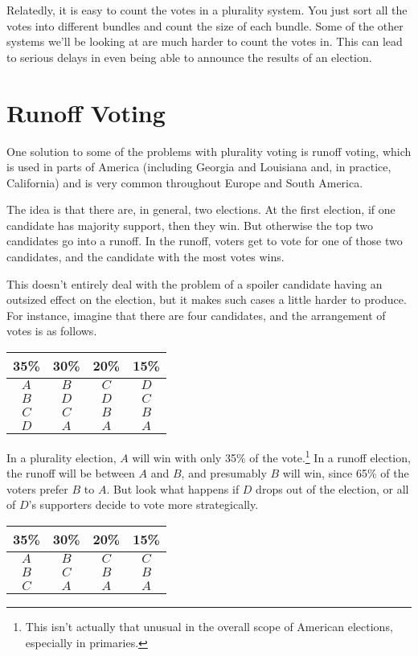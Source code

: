 \documentclass[11pt,]{article}
\let\rmarkdownfootnote\footnote%
\def\footnote{\protect\rmarkdownfootnote}
\begin{document}
Relatedly, it is easy to count the votes in a plurality system. You just
sort all the votes into different bundles and count the size of each
bundle. Some of the other systems we'll be looking at are much harder to
count the votes in. This can lead to serious delays in even being able
to announce the results of an election.

\hypertarget{runoff-voting}{%
\section{Runoff Voting}\label{runoff-voting}}

One solution to some of the problems with plurality voting is runoff
voting, which is used in parts of America (including Georgia and
Louisiana and, in practice, California) and is very common throughout
Europe and South America.

The idea is that there are, in general, two elections. At the first
election, if one candidate has majority support, then they win. But
otherwise the top two candidates go into a runoff. In the runoff, voters
get to vote for one of those two candidates, and the candidate with the
most votes wins.

This doesn't entirely deal with the problem of a spoiler candidate
having an outsized effect on the election, but it makes such cases a
little harder to produce. For instance, imagine that there are four
candidates, and the arrangement of votes is as follows.

\begin{longtable}[]{@{}cccc@{}}
\toprule
35\% & 30\% & 20\% & 15\%\tabularnewline
\midrule
\endhead
\(A\) & \(B\) & \(C\) & \(D\)\tabularnewline
\(B\) & \(D\) & \(D\) & \(C\)\tabularnewline
\(C\) & \(C\) & \(B\) & \(B\)\tabularnewline
\(D\) & \(A\) & \(A\) & \(A\)\tabularnewline
\bottomrule
\end{longtable}

In a plurality election, \(A\) will win with only 35\% of the
vote.\footnote{This isn't actually that unusual in the overall scope of
  American elections, especially in primaries.} In a runoff election,
the runoff will be between \(A\) and \(B\), and presumably \(B\) will
win, since 65\% of the voters prefer \(B\) to \(A\). But look what
happens if \(D\) drops out of the election, or all of \(D\)'s supporters
decide to vote more strategically.

\begin{longtable}[]{@{}cccc@{}}
\toprule
35\% & 30\% & 20\% & 15\%\tabularnewline
\midrule
\endhead
\(A\) & \(B\) & \(C\) & \(C\)\tabularnewline
\(B\) & \(C\) & \(B\) & \(B\)\tabularnewline
\(C\) & \(A\) & \(A\) & \(A\)\tabularnewline
\bottomrule
\end{longtable}
\end{document}
